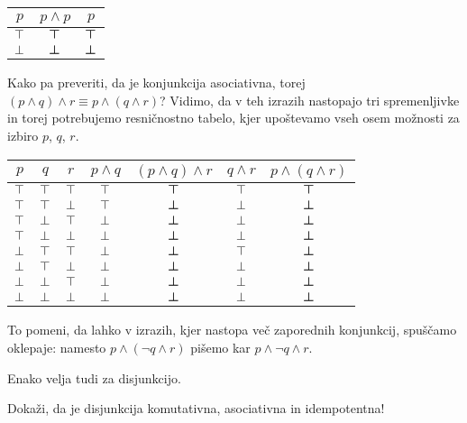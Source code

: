 		\begin{center}
			\begin{tabular}{c|cc}
				$p$ & $p \land p$ & $p$ \\
				\hline
				$\top$ & $\bm{\top}$ & $\bm{\top}$ \\
				$\bot$ & $\bm{\bot}$ & $\bm{\bot}$
			\end{tabular}
		\end{center}
		
		Kako pa preveriti, da je konjunkcija asociativna, torej $(p \land q) \land r \equiv p \land (q \land r)$? Vidimo, da v teh izrazih nastopajo tri spremenljivke in torej potrebujemo resničnostno tabelo, kjer upoštevamo vseh osem možnosti za izbiro $p$, $q$, $r$.
		
		\begin{center}
			\begin{tabular}{ccc|cccc}
				$p$ & $q$ & $r$ & $p \land q$ & $(p \land q) \land r$ & $q \land r$ & $p \land (q \land r)$ \\
				\hline
				$\top$ & $\top$ & $\top$ & $\top$ & $\bm{\top}$ & $\top$ & $\bm{\top}$ \\
				$\top$ & $\top$ & $\bot$ & $\top$ & $\bm{\bot}$ & $\bot$ & $\bm{\bot}$ \\
				$\top$ & $\bot$ & $\top$ & $\bot$ & $\bm{\bot}$ & $\bot$ & $\bm{\bot}$ \\
				$\top$ & $\bot$ & $\bot$ & $\bot$ & $\bm{\bot}$ & $\bot$ & $\bm{\bot}$ \\
				$\bot$ & $\top$ & $\top$ & $\bot$ & $\bm{\bot}$ & $\top$ & $\bm{\bot}$ \\
				$\bot$ & $\top$ & $\bot$ & $\bot$ & $\bm{\bot}$ & $\bot$ & $\bm{\bot}$ \\
				$\bot$ & $\bot$ & $\top$ & $\bot$ & $\bm{\bot}$ & $\bot$ & $\bm{\bot}$ \\
				$\bot$ & $\bot$ & $\bot$ & $\bot$ & $\bm{\bot}$ & $\bot$ & $\bm{\bot}$
			\end{tabular}
		\end{center}
		
		To pomeni, da lahko v izrazih, kjer nastopa več zaporednih konjunkcij, spuščamo oklepaje: namesto $p \land (\lnot{q} \land r)$ pišemo kar $p \land \lnot{q} \land r$.
		
		Enako velja tudi za disjunkcijo.
		
		\begin{vaja}
			Dokaži, da je disjunkcija komutativna, asociativna in idempotentna!
		\end{vaja}
		

